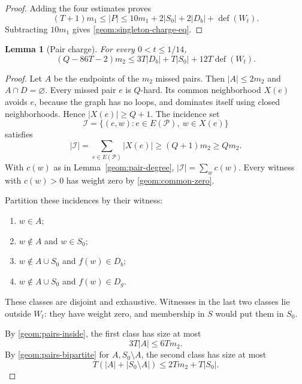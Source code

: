 \documentclass[11pt,a4paper]{article}
\newtheorem{lemma}[lemma]{Lemma}
\theoremstyle{definition}
\theoremstyle{remark}
\DeclareMathOperator{\Def}{def}
\begin{document}
\begin{proof}
Adding the four estimates proves
\[
 (T+1)m_1\leq|P|
 \leq10m_1+2|S_0|+2|D_b|+\Def(W_t).
\]
Subtracting $10m_1$ gives \eqref{geom:singleton-charge-eq}.
\end{proof}

\begin{lemma}[Pair charge]\label{geom:pair-charge}
For every $0<t\leq1/14$,
\begin{equation}\label{geom:pair-charge-eq}
 (Q-86T-2)m_2\leq3T|D_b|+T|S_0|+12T\Def(W_t).
\end{equation}
\end{lemma}
\begin{proof}
Let $A$ be the endpoints of the $m_2$ missed pairs. Then
$|A|\leq2m_2$ and $A\cap D=\varnothing$.
Every missed pair $e$ is $Q$-hard. Its common neighborhood $X(e)$
avoids $e$, because the graph has no loops, and dominates itself using
closed neighborhoods. Hence $|X(e)|\geq Q+1$.
The incidence set
\[
 \mathcal I=\{(e,w):e\in E(\mathcal P),\ w\in X(e)\}
\]
satisfies
\begin{equation}\label{geom:pair-incidence-lower}
 |\mathcal I|=\sum_{e\in E(\mathcal P)}|X(e)|
 \geq(Q+1)m_2\geq Qm_2.
\end{equation}
With $c(w)$ as in Lemma~\ref{geom:pair-degree},
$|\mathcal I|=\sum_w c(w)$. Every witness with $c(w)>0$ has weight
zero by \eqref{geom:common-zero}.

Partition these incidences by their witness:
\begin{enumerate}[label=(\roman*)]
\item $w\in A$;
\item $w\notin A$ and $w\in S_0$;
\item $w\notin A\cup S_0$ and $f(w)\in D_b$;
\item $w\notin A\cup S_0$ and $f(w)\in D_g$.
\end{enumerate}
These classes are disjoint and exhaustive. Witnesses in the last two
classes lie outside $W_t$: they have weight zero, and membership in
$S$ would put them in $S_0$.

By \eqref{geom:pairs-inside}, the first class has size at most
\begin{equation}\label{geom:pair-cat-one}
 3T|A|\leq6Tm_2.
\end{equation}
By \eqref{geom:pairs-bipartite} for $A,S_0\setminus A$, the second
class has size at most
\begin{equation}\label{geom:pair-cat-two}
 T(|A|+|S_0\setminus A|)\leq2Tm_2+T|S_0|.
\end{equation}


\end{proof}
\end{document}
